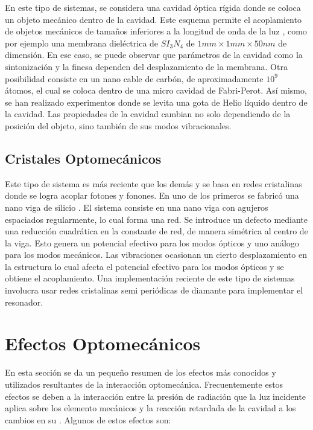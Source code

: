 \documentclass[10pt,a4paper]{report}
\begin{document}
En este tipo de sistemas, se considera una cavidad óptica rígida donde
se coloca un objeto mecánico dentro de la cavidad. Este esquema
permite el acoplamiento de objetos mecánicos de tamaños inferiores a
la longitud de onda de la luz \cite{KippenberCO}, como por ejemplo una
membrana dieléctrica de $SI_3N_4$ de $1mm \times 1mm \times 50nm$ de
dimensión\cite{SankeyMC}. En ese caso, se puede observar que
parámetros de la cavidad como la sintonización y la finesa dependen
del desplazamiento de la membrana. Otra posibilidad consiste en un
nano cable de carbón, de aproximadamente $10^9$ átomos, el cual se
coloca dentro de una micro cavidad de Fabri-Perot. Así mismo, se han
realizado experimentos donde se levita una gota de Helio líquido
dentro de la cavidad\cite{ChildressLD}. Las propiedades de la cavidad
cambian no solo dependiendo de la posición del objeto, sino también de
sus modos vibracionales\cite{FaveroCR}.

\subsection{Cristales Optomecánicos}

Este tipo de sistema es más reciente que los demás y se basa en redes
cristalinas donde se logra acoplar fotones y fonones. En uno de los primeros
 se fabricó una nano viga
de silicio \cite{EichenfieldOC}. El sistema consiste en una nano viga
con agujeros espaciados regularmente, lo cual forma una red. Se
introduce un defecto mediante una reducción cuadrática en la constante
de red, de manera simétrica al centro de la viga. Esto genera un
potencial efectivo para los modos ópticos y uno análogo para los modos
mecánicos. Las vibraciones ocasionan un cierto desplazamiento en la
estructura lo cual afecta el potencial efectivo para los modos ópticos
y se obtiene el acoplamiento. Una implementación reciente de este tipo
de sistemas involucra usar redes cristalinas semi periódicas de
diamante para implementar el resonador\cite{BurekDO}.

\section{Efectos Optomecánicos}

En esta sección se da un pequeño resumen de los efectos 
 más conocidos y utilizados resultantes de la interacción optomecánica. Frecuentemente estos efectos
{se} deben a la interacción entre la presión de radiación que la luz
incidente aplica sobre los elemento mecánicos y la reacción retardada
de la cavidad a los cambios en su .
Algunos de estos efectos son:
\end{document}
